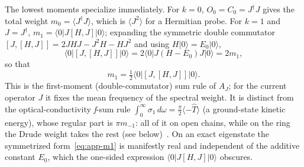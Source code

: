 \documentclass[aps,prb,onecolumn,superscriptaddress,longbibliography,floatfix]{revtex4-2}
\begin{document}
The lowest moments specialize immediately. For $k=0$, $O_0=C_0=J^\dagger J$ gives the total weight $m_0=\langle J^\dagger J\rangle$, which is $\langle J^2\rangle$ for a Hermitian probe. For $k=1$ and $J=J^\dagger$, ${m_1=\langle 0|J[H,J]|0\rangle}$; expanding the symmetric double commutator ${[J,[H,J]]}$\allowbreak${{}=2JHJ-J^2H-HJ^2}$ and using $H|0\rangle=E_0|0\rangle$,
\begin{equation}
\langle 0|[J,[H,J]]|0\rangle=2\langle 0|J(H-E_0)J|0\rangle=2m_1,
\end{equation}
so that
\begin{equation}
m_1=\tfrac{1}{2}\langle 0|[J,[H,J]]|0\rangle .
\label{eq:app-m1}
\end{equation}
This is the first-moment (double-commutator) sum rule of $A_J$; for the current operator $J$ it fixes the mean frequency of the spectral weight. It is distinct from the optical-conductivity \textit{f}-sum rule $\int_0^\infty\sigma_1\,d\omega=\tfrac{\pi}{2}\langle-\hat T\rangle$ (a ground-state kinetic energy), whose regular part is $\pi m_{-1}$: all of it on open chains, while on the ring the Drude weight takes the rest (see below)~\cite{Kohn1964,Maldague1977,HohenbergMartin1965}. On an exact eigenstate the symmetrized form~\eqref{eq:app-m1} is manifestly real and independent of the additive constant $E_0$, which the one-sided expression $\langle 0|J[H,J]|0\rangle$ obscures.
\end{document}
